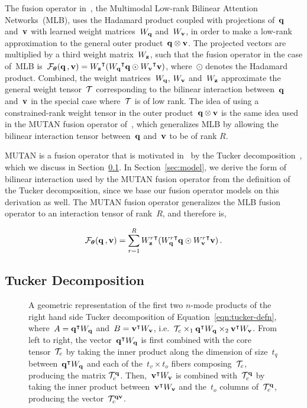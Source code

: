 The fusion operator in~\cite{Kim2017}, the Multimodal Low-rank Bilinear
Attention Networks~(MLB), uses the Hadamard product coupled with projections
of~$\mathbf{q}$ and~$\mathbf{v}$ with learned weight matrices~$W_{\mathbf{q}}$ and~$W_{\mathbf{v}}$, in order to
make a low-rank approximation to the general outer product~$\mathbf{q} \otimes \mathbf{v}$. The
projected vectors are multiplied by a third weight matrix~$W_{\mathbf{z}}$, such that
the fusion operator in the case of~MLB
is~$\mathcal{F_{\boldsymbol{\theta}}}{(\mathbf{q} \,, \mathbf{v})} = {W_{\mathbf{z}}}^\intercal{} ({W_{\mathbf{q}}}^\intercal{} \mathbf{q} \odot {W_{\ensuremath{\mathbf{v}}}}^\intercal{} \mathbf{v})$,
where~$\odot$ denotes the Hadamard product. Combined, the weight
matrices~$W_{\mathbf{q}}$, $W_{\mathbf{v}}$ and~$W_{\mathbf{z}}$ approximate the general weight tensor~$\mathcal{T}$
corresponding to the bilinear interaction between~$\mathbf{q}$ and~$\mathbf{v}$ in the special
case where~$\mathcal{T}$ is of low rank. The idea of using a constrained-rank weight
tensor in the outer product~$\mathbf{q} \otimes \mathbf{v}$ is the same idea used in the MUTAN
fusion operator of~\cite{ben2017mutan}, which generalizes MLB by allowing the
bilinear interaction tensor between~$\mathbf{q}$ and~$\mathbf{v}$ to be of rank $R$.

MUTAN is a fusion operator that is motivated
in~\cite{ben2017mutan} by the Tucker
decomposition~\cite{kolda2009tensor}, which we discuss in
Section~\ref{sec:tucker}. In Section~\ref{sec:model}, we derive the form of
bilinear interaction used by the MUTAN fusion operator from the definition of
the Tucker decomposition, since we base our fusion operator models on this
derivation as well. The MUTAN fusion operator generalizes the MLB fusion
operator to an interaction tensor of rank~$R$, and therefore is,

\begin{equation}
        \mathcal{F_{\boldsymbol{\theta}}}{(\mathbf{q} \,, \mathbf{v})} = \sum_{r = 1}^R {W^r_{\mathbf{z}}}^\intercal{} ({W^r_{\mathbf{q}}}^\intercal{} \mathbf{q} \odot {W^r_{\ensuremath{\mathbf{v}}}}^\intercal{} \mathbf{v}) \,.
\label{eqn:mutan-fusop}
\end{equation}


\subsection{Tucker Decomposition}
\label{sec:tucker}

\newcommand{\qtWq}{\q^\intercal{} W_\q{}}
\newcommand{\vtWv}{\v^\intercal{} W_\v{}}
\begin{figure}[!t]
\centering

\caption{A geometric representation of the first two $n$-mode products of the
         right hand side Tucker decomposition of Equation~\ref{eqn:tucker-defn},
         where~$A = \qtWq$ and~$B = \vtWv$, i.e.\ $\T_c \times_1 \qtWq \times_2 \vtWv$.
         From left to right, the vector~$\qtWq$ is first combined with the core
         tensor~$\mathcal{T}_c$ by taking the inner product along the dimension of
         size~$t_q$ between~$\qtWq$ and each of the~$t_v \times t_o$ fibers
         composing~$\mathcal{T}_c$, producing the matrix $\mathcal{T}_c^{\mathbf{q}}$.  Then,~$\vtWv$ is
         combined with~$\mathcal{T}_c^{\mathbf{q}}$ by taking the inner product between~$\vtWv$
         and the~$t_o$ columns of~$\mathcal{T}_c^{\mathbf{q}}$, producing the
         vector~$\mathcal{T}_c^{\mathbf{q}{}\mathbf{v}{}}$.}
\label{fig:n-mode-prod}
\end{figure}

